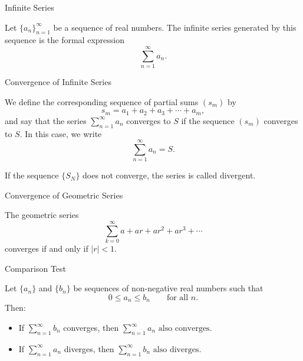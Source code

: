 \documentclass[12pt, a4paper]{article}
\begin{document}
\FrontPage
\Large

\begin{heading}
	Infinite Series
\end{heading}

\begin{definition}
	Let $\{a_n\}_{n=1}^{\infty}$ be a sequence of real numbers.  
	The infinite series generated by this sequence is the formal expression
	\[
	\sum_{n=1}^{\infty} a_n .
	\]
\end{definition}

\clearpage

\begin{heading}
	Convergence of Infinite Series
\end{heading}

\begin{definition}
	We define the corresponding sequence of partial sums $(s_m)$ by
	\[
	s_m = a_1 + a_2 + a_3 + \cdots + a_m,
	\]
	and say that the series 
	\(
	\sum_{n=1}^{\infty} a_n
	\)
	converges to $S$ if the sequence $(s_m)$ converges to $S$.  
	In this case, we write
	\[
	\sum_{n=1}^{\infty} a_n = S.
	\]
	\vspace{5pt}
	
	If the sequence $\{S_N\}$ does not converge, the series is called divergent.
\end{definition}

\clearpage

\begin{heading}
	Convergence of Geometric Series
\end{heading}

\vspace{10pt}

\begin{theorem}
	The geometric series 
	\[
	\sum_{k=0}^{\infty} a + ar + ar^{2} + ar^{3} + \cdots
	\]
	converges if and only if $|r| < 1$.
\end{theorem}

\clearpage

\begin{heading}
	Comparison Test
\end{heading}

\vspace{10pt}

\begin{theorem}
	Let $\{a_n\}$ and $\{b_n\}$ be sequences of non-negative real numbers such that  
	\[
	0 \le a_n \le b_n \qquad \text{for all } n.
	\]
	Then:

	\begin{itemize}
		\item[(i)] If $\displaystyle \sum_{n=1}^{\infty} b_n$ converges, then $\displaystyle \sum_{n=1}^{\infty} a_n \text{ also converges}.$

		\item[(ii)] If $\displaystyle \sum_{n=1}^{\infty} a_n$ diverges, then $\displaystyle \sum_{n=1}^{\infty} b_n \text{ also diverges}.$
	\end{itemize}
\end{theorem}
\end{document}
